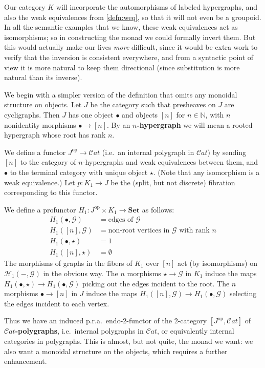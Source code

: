 \documentclass{article}
\theoremstyle{definition}
\theoremstyle{remark}
\def\G{\mathcal{G}}
\def\H{\mathcal{H}}
\def\Set{\mathbf{Set}}
\def\Cat{\ensuremath{\mathcal{C}\mathit{at}}}
\def\op{^{\mathrm{op}}}
\def\N{\mathbb{N}}
\begin{document}
Our category $K$ will incorporate the automorphisms of labeled hypergraphs, and also the weak equivalences from \cref{defn:weq}, so that it will not even be a groupoid.
In all the semantic examples that we know, these weak equivalences act as isomorphisms; so in constructing the monad we could formally invert them.
But this would actually make our lives \emph{more} difficult, since it would be extra work to verify that the inversion is consistent everywhere, and from a syntactic point of view it is more natural to keep them directional (since substitution is more natural than its inverse).

We begin with a simpler version of the definition that omits any monoidal structure on objects.
Let $J$ be the category such that presheaves on $J$ are cycligraphs.
Then $J$ has one object $\bullet$ and objects $[n]$ for $n\in\N$, with $n$ nonidentity morphisms $\bullet\to [n]$.
By an \textbf{$n$-hypergraph} we will mean a rooted hypergraph whose root has rank $n$.

We define a functor $J\op\to\Cat$ (i.e.\ an internal polygraph in $\Cat$) by sending $[n]$ to the category of $n$-hypergraphs and weak equivalences between them, and $\bullet$ to the terminal category with unique object $\star$.
(Note that any isomorphism is a weak equivalence.)
Let $p:K_1 \to J$ be the (split, but not discrete) fibration corresponding to this functor.

We define a profunctor $H_1 : J\op\times K_1 \to \Set$ as follows:
\begin{align*}
  H_1(\bullet,\G) &= \text{edges of $\G$}\\
  H_1([n],\G) &= \text{non-root vertices in $\G$ with rank $n$}\\
  H_1(\bullet,\star) &= 1\\
  H_1([n],\star) &= \emptyset
\end{align*}
The morphisms of graphs in the fibers of $K_1$ over $[n]$ act (by isomorphisms) on $\H_1(-,\G)$ in the obvious way.
The $n$ morphisms $\star\to\G$ in $K_1$ induce the maps $H_1(\bullet,\star) \to H_1(\bullet,\G)$ picking out the edges incident to the root.
The $n$ morphisms $\bullet\to [n]$ in $J$ induce the maps $H_1([n],\G) \to H_1(\bullet,\G)$ selecting the edges incident to each vertex.

Thus we have an induced p.r.a.\ endo-2-functor of the 2-category $[J\op,\Cat]$ of \textbf{\Cat-polygraphs}, i.e.\ internal polygraphs in \Cat, or equivalently internal categories in polygraphs.
This is almost, but not quite, the monad we want: we also want a monoidal structure on the objects, which requires a further enhancement.
\end{document}
